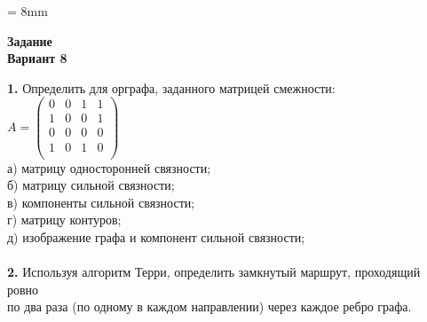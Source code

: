 \documentclass{article}
\begin{document}
\voffset = 8mm
\begin{flushleft}
	\begin{Large}
		\hspace{8mm}\textbf{Задание}
		\vspace{10mm}
		\\
		\hspace{8mm}\textbf{Вариант 8}
	\end{Large}
\end{flushleft}
\vspace{8mm}
\large
\hspace{8mm}\textbf{1.} Определить для орграфа, заданного матрицей смежности:
\vspace{5mm}
\\
\hspace*{50mm}
$A = 
\begin{pmatrix}
	0 & 0 & 1 & 1\\
	1 & 0 & 0 & 1\\
	0 & 0 & 0 & 0\\
	1 & 0 & 1 & 0\\
\end{pmatrix}$
\vspace{5mm}
\\
\hspace*{12mm} а) матрицу односторонней связности;
\\
\hspace*{12mm} б) матрицу сильной связности;
\\
\hspace*{12mm} в) компоненты сильной связности;
\\
\hspace*{12mm} г) матрицу контуров;
\\
\hspace*{12mm} д) изображение графа и компонент сильной связности;
\\
\\
\hspace*{8mm}\textbf{2.} Используя алгоритм Терри, определить замкнутый маршрут, проходящий ровно
\\
\hspace*{12mm} по два раза (по одному в каждом направлении) через каждое ребро графа.
\vspace{5mm}
\\
\end{document}
